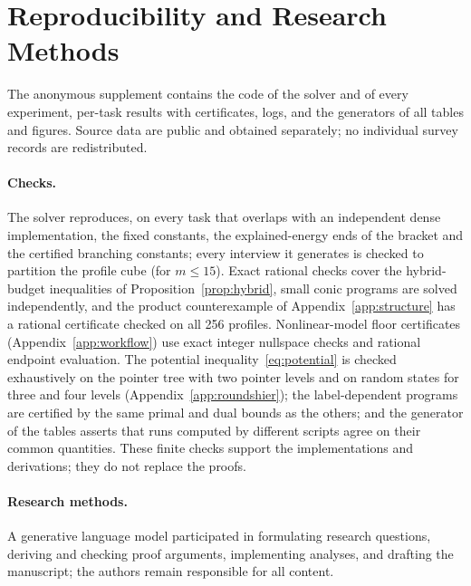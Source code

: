 \section{Reproducibility and Research Methods}\label{app:repro}
The anonymous supplement contains the code of the solver and of every experiment, per-task results with certificates, logs, and the generators of all tables and figures. Source data are public and obtained separately; no individual survey records are redistributed.

\paragraph{Checks.}
The solver reproduces, on every task that overlaps with an independent dense implementation, the fixed constants, the explained-energy ends of the bracket and the certified branching constants; every interview it generates is checked to partition the profile cube (for $m\le15$). Exact rational checks cover the hybrid-budget inequalities of Proposition~\ref{prop:hybrid}, small conic programs are solved independently, and the product counterexample of Appendix~\ref{app:structure} has a rational certificate checked on all 256 profiles. Nonlinear-model floor certificates (Appendix~\ref{app:workflow}) use exact integer nullspace checks and rational endpoint evaluation. The potential inequality~\eqref{eq:potential} is checked exhaustively on the pointer tree with two pointer levels and on random states for three and four levels (Appendix~\ref{app:roundshier}); the label-dependent programs are certified by the same primal and dual bounds as the others; and the generator of the tables asserts that runs computed by different scripts agree on their common quantities. These finite checks support the implementations and derivations; they do not replace the proofs.

\paragraph{Research methods.}
A generative language model participated in formulating research questions, deriving and checking proof arguments, implementing analyses, and drafting the manuscript; the authors remain responsible for all content.
